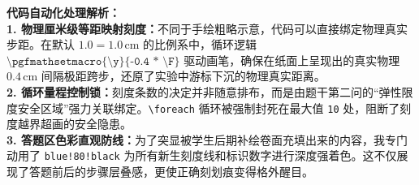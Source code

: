 \vspace{0.6cm}

{\small\color{blue!70!black}
\textbf{代码自动化处理解析：}\\
\textbf{1. 物理厘米级等距映射刻度：}不同于手绘粗略示意，代码可以直接绑定物理真实步距。在默认 $1.0 = 1.0\,\text{cm}$ 的比例系中，循环逻辑 $\texttt{\textbackslash pgfmathsetmacro\{\textbackslash y\}\{-0.4 * \textbackslash F\}}$ 驱动画笔，确保在纸面上呈现出的真实物理 $0.4\,\text{cm}$ 间隔极距跨步，还原了实验中游标下沉的物理真实距离。\\
\textbf{2. 循环量程控制锁：}刻度条数的决定并非随意排布，而是由题干第二问的“弹性限度安全区域”强力关联绑定。\texttt{\textbackslash foreach} 循环被强制封死在最大值 \texttt{10} 处，阻断了刻度越界超画的安全隐患。\\
\textbf{3. 答题区色彩直观防线：}为了突显被学生后期补绘卷面充填出来的内容，我专门动用了 \texttt{blue!80!black} 为所有新生刻度线和标识数字进行深度强着色。这不仅展现了答题前后的步骤层叠感，更使正确刻划痕变得格外醒目。
}


